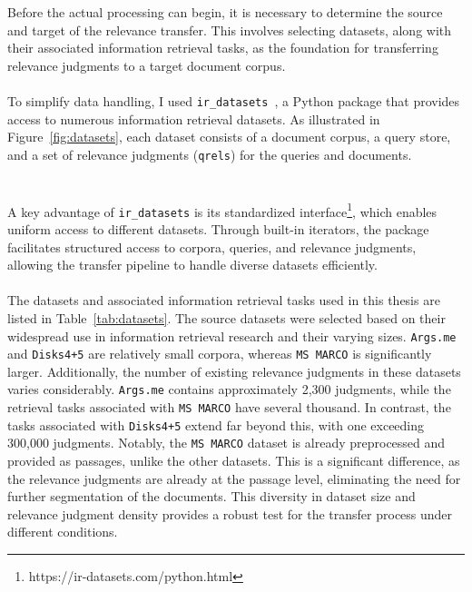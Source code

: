Before the actual processing can begin, it is necessary to determine the source and target of the relevance transfer. This involves selecting datasets, along with their associated information retrieval tasks, as the foundation for transferring relevance judgments to a target document corpus.
\\\\
To simplify data handling, I used \texttt{ir\_datasets}~\citep{macavaney:2021}, a Python package that provides access to numerous information retrieval datasets. As illustrated in Figure~\ref{fig:datasets}, each dataset consists of a document corpus, a query store, and a set of relevance judgments (\texttt{qrels}) for the queries and documents.
\\\\\\
A key advantage of \texttt{ir\_datasets} is its standardized interface\footnote{https://ir-datasets.com/python.html}, which enables uniform access to different datasets. Through built-in iterators, the package facilitates structured access to corpora, queries, and relevance judgments, allowing the transfer pipeline to handle diverse datasets efficiently.
\\\\
The datasets and associated information retrieval tasks used in this thesis are listed in Table~\ref{tab:datasets}. The source datasets were selected based on their widespread use in information retrieval research and their varying sizes. \texttt{Args.me} and \texttt{Disks4+5} are relatively small corpora, whereas \texttt{MS MARCO} is significantly larger. Additionally, the number of existing relevance judgments in these datasets varies considerably. \texttt{Args.me} contains approximately 2,300 judgments, while the retrieval tasks associated with \texttt{MS MARCO} have several thousand. In contrast, the tasks associated with \texttt{Disks4+5} extend far beyond this, with one exceeding 300,000 judgments. Notably, the \texttt{MS MARCO} dataset is already preprocessed and provided as passages, unlike the other datasets. This is a significant difference, as the relevance judgments are already at the passage level, eliminating the need for further segmentation of the documents. This diversity in dataset size and relevance judgment density provides a robust test for the transfer process under different conditions.
